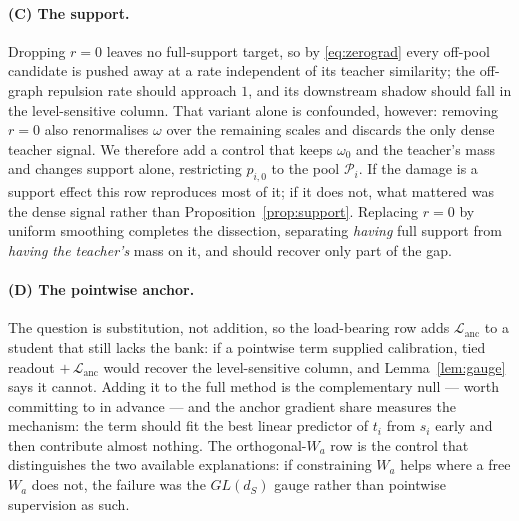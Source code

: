 \paragraph{(C) The support.}
Dropping $r=0$ leaves no full-support target, so by \eqref{eq:zerograd} every off-pool
candidate is pushed away at a rate independent of its teacher similarity; the off-graph
repulsion rate should approach $1$, and its downstream shadow should fall in the
level-sensitive column. That variant alone is confounded, however: removing $r=0$ also
renormalises $\omega$ over the remaining scales and discards the only dense teacher signal.
We therefore add a control that keeps $\omega_0$ and the teacher's mass and changes support
alone, restricting $p_{i,0}$ to the pool $\mathcal{P}_i$. If the damage is a support effect
this row reproduces most of it; if it does not, what mattered was the dense signal rather
than Proposition~\ref{prop:support}. Replacing $r=0$ by uniform smoothing completes the
dissection, separating \emph{having} full support from \emph{having the teacher's} mass on
it, and should recover only part of the gap.

\paragraph{(D) The pointwise anchor.}
The question is substitution, not addition, so the load-bearing row adds
$\mathcal{L}_{\mathrm{anc}}$ to a student that still lacks the bank: if a pointwise term
supplied calibration, tied readout $+\,\mathcal{L}_{\mathrm{anc}}$ would recover the
level-sensitive column, and Lemma~\ref{lem:gauge} says it cannot. Adding it to the full
method is the complementary null --- worth committing to in advance --- and the anchor
gradient share measures the mechanism: the term should fit the best linear predictor of
$t_i$ from $s_i$ early and then contribute almost nothing. The orthogonal-$W_a$ row is the
control that distinguishes the two available explanations: if constraining $W_a$ helps where
a free $W_a$ does not, the failure was the $GL(d_S)$ gauge rather than pointwise supervision
as such.

